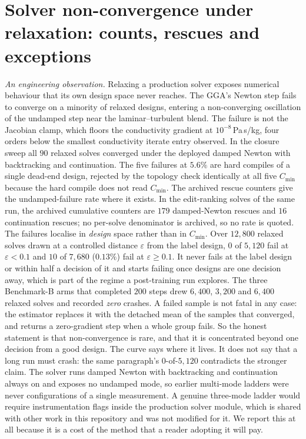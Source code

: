 \section{Solver non-convergence under relaxation: counts, rescues and exceptions}
\label{sec:sxii}
\emph{An engineering observation.}  Relaxing a production solver exposes numerical behaviour that its own design
space never reaches.  The GGA's Newton step fails to converge on a minority of
relaxed designs, entering a non-converging oscillation of the undamped step
near the laminar--turbulent blend.  The failure is not the Jacobian clamp, which floors the conductivity gradient
at $10^{-8}$\,Pa\,s/kg, four orders below the smallest conductivity iterate entry observed.  In the
closure sweep all $90$ relaxed solves converged under the deployed damped Newton
with backtracking and continuation.  The five
failures at $5.6\%$ are hard compiles of a single dead-end design, rejected by the
topology check identically at all five $C_{\min}$ because the hard compile does not
read $C_{\min}$.  The archived rescue counters give the undamped-failure rate where it exists. In the edit-ranking solves of the same run, the archived cumulative counters are
$179$ damped-Newton rescues and $16$ continuation rescues; no per-solve
denominator is archived, so no rate is quoted.
The failures localise in \emph{design} space rather than in $C_{\min}$.  Over
$12{,}800$ relaxed solves drawn at a controlled distance $\varepsilon$ from the
label design, $0$ of $5{,}120$ fail at $\varepsilon<0.1$ and $10$ of $7{,}680$
($0.13\%$) fail at $\varepsilon\ge0.1$.  It never fails at the label design or within
half a decision of it and starts failing once designs are one decision away, which is
part of the regime a post-training run explores.  The three
Benchmark-B arms that completed $200$ steps drew $6{,}400$, $3{,}200$ and $6{,}400$
relaxed solves and recorded \emph{zero} crashes.  A failed sample is not fatal in
any case: the estimator replaces it with the detached mean of the samples that
converged, and returns a zero-gradient step when a whole group fails.  So the honest statement is that non-convergence is rare, and that it is
concentrated beyond one decision from a good design.  The curve says where it lives.
It does not say that a long run must crash: the same paragraph's $0$-of-$5{,}120$
contradicts the stronger claim.
The solver runs
damped Newton with backtracking and continuation always on and exposes no undamped
mode, so earlier multi-mode ladders were never configurations of a single
measurement.
A genuine three-mode ladder
would require instrumentation flags inside the production solver module, which is
shared with
other work in this repository and was not modified for it.  We report this
at all because it is a cost of the method that a reader adopting it will pay.


